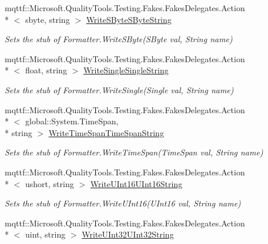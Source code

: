 \begin{DoxyCompactItemize}
mqttf\-::\-Microsoft.\-Quality\-Tools.\-Testing.\-Fakes.\-Fakes\-Delegates.\-Action\\*
$<$ sbyte, string $>$ \hyperlink{class_system_1_1_runtime_1_1_serialization_1_1_fakes_1_1_stub_formatter_a693a0bf6617046797c3d3fdc535ae2b5}{Write\-S\-Byte\-S\-Byte\-String}
\begin{DoxyCompactList}\small\item\em Sets the stub of Formatter.\-Write\-S\-Byte(\-S\-Byte val, String name)\end{DoxyCompactList}\item 
mqttf\-::\-Microsoft.\-Quality\-Tools.\-Testing.\-Fakes.\-Fakes\-Delegates.\-Action\\*
$<$ float, string $>$ \hyperlink{class_system_1_1_runtime_1_1_serialization_1_1_fakes_1_1_stub_formatter_a56a9d0cf5b556045b0fe2fd165aadeae}{Write\-Single\-Single\-String}
\begin{DoxyCompactList}\small\item\em Sets the stub of Formatter.\-Write\-Single(\-Single val, String name)\end{DoxyCompactList}\item 
mqttf\-::\-Microsoft.\-Quality\-Tools.\-Testing.\-Fakes.\-Fakes\-Delegates.\-Action\\*
$<$ global\-::\-System.\-Time\-Span, \\*
string $>$ \hyperlink{class_system_1_1_runtime_1_1_serialization_1_1_fakes_1_1_stub_formatter_ae262dd960f9932aae9e9e412628038de}{Write\-Time\-Span\-Time\-Span\-String}
\begin{DoxyCompactList}\small\item\em Sets the stub of Formatter.\-Write\-Time\-Span(\-Time\-Span val, String name)\end{DoxyCompactList}\item 
mqttf\-::\-Microsoft.\-Quality\-Tools.\-Testing.\-Fakes.\-Fakes\-Delegates.\-Action\\*
$<$ ushort, string $>$ \hyperlink{class_system_1_1_runtime_1_1_serialization_1_1_fakes_1_1_stub_formatter_a9de8293da8ef4c533c5c92167c751b41}{Write\-U\-Int16\-U\-Int16\-String}
\begin{DoxyCompactList}\small\item\em Sets the stub of Formatter.\-Write\-U\-Int16(\-U\-Int16 val, String name)\end{DoxyCompactList}\item 
mqttf\-::\-Microsoft.\-Quality\-Tools.\-Testing.\-Fakes.\-Fakes\-Delegates.\-Action\\*
$<$ uint, string $>$ \hyperlink{class_system_1_1_runtime_1_1_serialization_1_1_fakes_1_1_stub_formatter_ab5c6047c048bf0adb05c7b54ab3ceab0}{Write\-U\-Int32\-U\-Int32\-String}

\end{DoxyCompactItemize}
